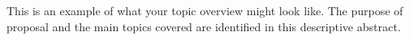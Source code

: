 \begin{flushleft}
This is an example of what your topic overview might look like.  The purpose of proposal and the main topics covered are identified in this descriptive abstract.
\end{flushleft}
